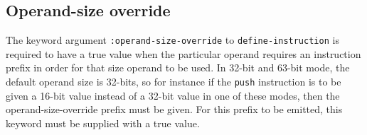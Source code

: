 \subsection{Operand-size override}

The keyword argument \texttt{:operand-size-override} to
\texttt{define-instruction} is required to have a true value when the
particular operand requires an instruction prefix in order for that
size operand to be used.  In 32-bit and 63-bit mode, the default
operand size is 32-bits, so for instance if the \texttt{push}
instruction is to be given a 16-bit value instead of a 32-bit value in
one of these modes, then the operand-size-override prefix must be
given.  For this prefix to be emitted, this keyword must be supplied
with a true value.
